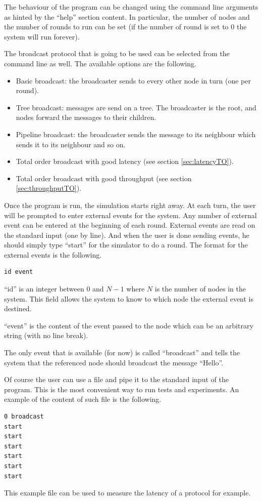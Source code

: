 \documentclass[a4paper]{article}
\begin{document}
The behaviour of the program can be changed using the command line arguments
as hinted by the ``help'' section content. In particular, the number of nodes
and the number of rounds to run can be set (if the number of round is set to
$0$ the system will run forever).

The broadcast protocol that is going to be used can be selected from the
command line as well. The available options are the following.
\begin{itemize}
    \item Basic broadcast: the broadcaster sends to every other node in turn
        (one per round).
    \item Tree broadcast: messages are send on a tree. The broadcaster is the
        root, and nodes forward the messages to their children.
    \item Pipeline broadcast: the broadcaster sends the message to its neighbour
        which sends it to its neighbour and so on.
    \item Total order broadcast with good latency (see section
        \ref{sec:latencyTO}).
    \item Total order broadcast with good throughput (see section
        \ref{sec:throughputTO}).
\end{itemize}

Once the program is run, the simulation starts right away. At each turn, the
user will be prompted to enter external events for the system. Any number of
external event can be entered at the beginning of each round. External events
are read on the standard input (one by line). And when the user is done
sending events, he should simply type ``start'' for the simulator to do a
round. The format for the external events is the following.
\begin{lstlisting}
id event
\end{lstlisting}
``id'' is an integer between $0$ and $N-1$ where $N$ is the number of nodes in
the system. This field allows the system to know to which node the external
event is destined.

``event'' is the content of the event passed to the node which can be an
arbitrary string (with no line break).

The only event that is available (for now) is called ``broadcast'' and tells
the system that the referenced node should broadcast the message ``Hello''.

Of course the user can use a file and pipe it to the standard input of the
program. This is the most convenient way to run tests and experiments. An
example of the content of such file is the following.
\begin{verbatim}
0 broadcast
start
start
start
start
start
start
\end{verbatim}
This example file can be used to measure the latency of a protocol for
example.
\end{document}
